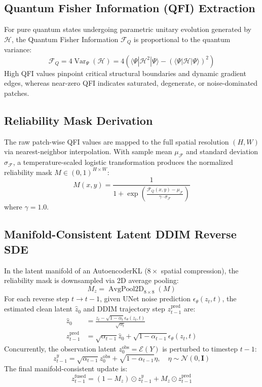 \documentclass[10pt,journal,compsoc]{IEEEtran}
\begin{document}
\subsection{Quantum Fisher Information (QFI) Extraction}
For pure quantum states undergoing parametric unitary evolution generated by $\mathcal{H}$, the Quantum Fisher Information $\mathcal{F}_Q$ is proportional to the quantum variance:
\begin{equation}
\mathcal{F}_Q = 4 \operatorname{Var}_\Psi(\mathcal{H}) = 4 \left( \langle \Psi | \mathcal{H}^2 | \Psi \rangle - \left( \langle \Psi | \mathcal{H} | \Psi \rangle \right)^2 \right)
\end{equation}
High QFI values pinpoint critical structural boundaries and dynamic gradient edges, whereas near-zero QFI indicates saturated, degenerate, or noise-dominated patches.

\subsection{Reliability Mask Derivation}
The raw patch-wise QFI values are mapped to the full spatial resolution $(H, W)$ via nearest-neighbor interpolation. With sample mean $\mu_{\mathcal{F}}$ and standard deviation $\sigma_{\mathcal{F}}$, a temperature-scaled logistic transformation produces the normalized reliability mask $M \in (0, 1)^{H \times W}$:
\begin{equation}
M(x, y) = \frac{1}{1 + \exp\left( \frac{\mathcal{F}_Q(x, y) - \mu_{\mathcal{F}}}{\gamma \cdot \sigma_{\mathcal{F}}} \right)}
\end{equation}
where $\gamma = 1.0$.

\subsection{Manifold-Consistent Latent DDIM Reverse SDE}
In the latent manifold of an AutoencoderKL ($8\times$ spatial compression), the reliability mask is downsampled via 2D average pooling:
\begin{equation}
M_z = \operatorname{AvgPool2D}_{8\times8}(M)
\end{equation}
For each reverse step $t \to t-1$, given UNet noise prediction $\epsilon_\theta(z_t, t)$, the estimated clean latent $\hat{z}_0$ and DDIM trajectory step $z_{t-1}^{\text{pred}}$ are:
\begin{align}
\hat{z}_0 &= \frac{z_t - \sqrt{1 - \alpha_t} \epsilon_\theta(z_t, t)}{\sqrt{\alpha_t}} \\
z_{t-1}^{\text{pred}} &= \sqrt{\alpha_{t-1}} \hat{z}_0 + \sqrt{1 - \alpha_{t-1}} \epsilon_\theta(z_t, t)
\end{align}
Concurrently, the observation latent $z_0^{\text{obs}} = \mathcal{E}(Y)$ is perturbed to timestep $t-1$:
\begin{equation}
z_{t-1}^y = \sqrt{\alpha_{t-1}} z_0^{\text{obs}} + \sqrt{1 - \alpha_{t-1}} \eta, \quad \eta \sim \mathcal{N}(0, \mathbf{I})
\end{equation}
The final manifold-consistent update is:
\begin{equation}
z_{t-1}^{\text{fused}} = (1 - M_z) \odot z_{t-1}^y + M_z \odot z_{t-1}^{\text{pred}}
\end{equation}
\end{document}
